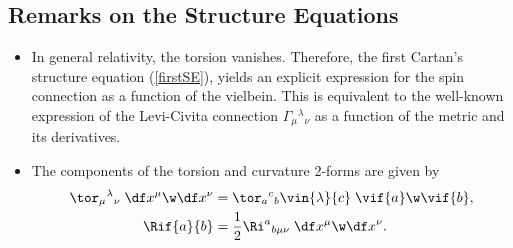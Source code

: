 \subsection*{Remarks on the Structure Equations}

\begin{itemize}
\item In general relativity, the torsion vanishes. Therefore, the first Cartan's structure equation (\ref{firstSE}), yields an explicit expression for the spin connection as a function of the vielbein. This is equivalent to the well-known expression of the Levi-Civita connection $\Gamma_\mu{}^\lambda{}_\nu$ as a function of the metric and its derivatives.
\item The components of the torsion and curvature 2-forms are given by
  \begin{align}
    \tor_\mu{}^\lambda{}_\nu \;\df x^\mu\w\df x^\nu &= \tor_a{}^c{}_b \vin{\lambda}{c}\;\vif{a}\w\vif{b},\\
    \Rif{a}{b} &= \frac{1}{2}\Ri^a{}_{b\mu\nu}\;\df x^\mu\w\df x^\nu.\label{def-curv-comp}
  \end{align}
\end{itemize}

